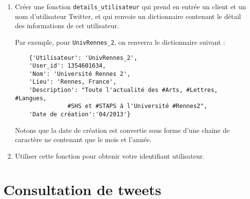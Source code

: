 \documentclass[11pt,a4paper]{article}
\begin{document}
\begin{enumerate}

    \item Créer une fonction \verb+details_utilisateur+ qui prend en entrée un client et un nom d'utilisateur Twitter, et qui renvoie un dictionnaire contenant le détail des informations de cet utilisateur. 
    
    Par exemple, pour \verb+UnivRennes_2+, on renverra le dictionnaire suivant : 
    \begin{verbatim}
    {'Utilisateur': 'UnivRennes_2', 
    'User_id': 1354601634, 
    'Nom': 'Université Rennes 2', 
    'Lieu': 'Rennes, France', 
    'Description': "Toute l'actualité des #Arts, #Lettres, #Langues,
               #SHS et #STAPS à l'Université #Rennes2", 
    'Date de création':'04/2013'}
    \end{verbatim}
    Notons que la date de création est convertie sous forme d'une chaine de caractère ne contenant que le mois et l'année.

    \item Utiliser cette fonction pour obtenir votre identifiant utilisateur.

\end{enumerate}


\section{Consultation de tweets}
\end{document}
